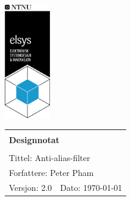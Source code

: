 \begin{minipage}[c]{0.15\textwidth}
\includegraphics[width=2cm]{Images/elsys_pos_staaende_ntnu.png}
\end{minipage}
\begin{minipage}[c]{0.80\textwidth}

\renewcommand{\arraystretch}{1.7}
\large 
\begin{tabularx}{\textwidth}{|X|X|}
\hline
\multicolumn{2}{|l|}{} \\
\multicolumn{2}{|l|}{\huge \textbf{Designnotat}} \\
\multicolumn{2}{|l|}{}  \\
\hline
\multicolumn{2}{|l|}{Tittel: 
Anti-alias-filter
} \\
\hline
\multicolumn{2}{|l|}{Forfattere: 
Peter Pham
} \\
\hline
Versjon: 2.0 & Dato: \today
\\
\hline 
\end{tabularx}
\end{minipage}
\normalsize


